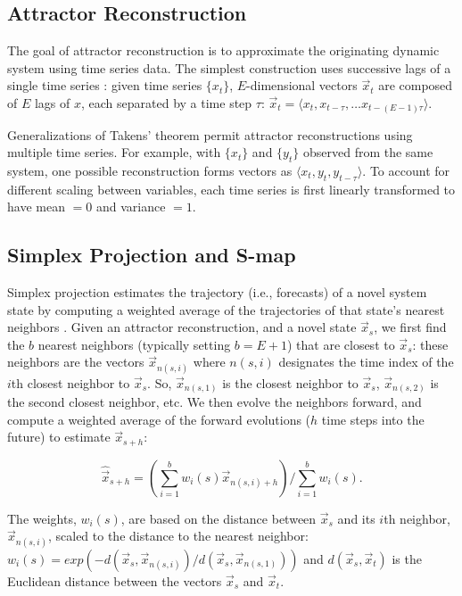 \subsection{Attractor Reconstruction}

The goal of attractor reconstruction is to approximate the originating dynamic system using time series data. The simplest construction uses successive lags of a single time series \cite{Takens_1981, Packard_1980}: given time series $\{x_t\}$, $E$-dimensional vectors $\vec{x}_t$ are composed of $E$ lags of $x$, each separated by a time step $\tau$: $\vec{x}_t = \langle x_t, x_{t-\tau}, \dots x_{t-(E-1)\tau}\rangle$.

Generalizations of Takens' theorem \cite{Deyle_2011, Sauer_1991} permit attractor reconstructions using multiple time series. For example, with $\{x_t\}$ and $\{y_t\}$ observed from the same system, one possible reconstruction forms vectors as $\langle x_t, y_t, y_{t-\tau}\rangle$. To account for different scaling between variables, each time series is first linearly transformed to have mean $= 0$ and variance $= 1$.

\subsection{Simplex Projection and S-map}

Simplex projection estimates the trajectory (i.e., forecasts) of a novel system state by computing a weighted average of the trajectories of that state's nearest neighbors \cite{Sugihara_1990}. Given an attractor reconstruction, and a novel state $\vec{x}_s$, we first find the $b$ nearest neighbors (typically setting $b = E + 1$) that are closest to $\vec{x}_s$: these neighbors are the vectors $\vec{x}_{n(s, i)}$ where $n(s, i)$ designates the time index of the $i$th closest neighbor to $\vec{x}_s$. So, $\vec{x}_{n(s, 1)}$ is the closest neighbor to $\vec{x}_s$, $\vec{x}_{n(s, 2)}$ is the second closest neighbor, etc. We then evolve the neighbors forward, and compute a weighted average of the forward evolutions ($h$ time steps into the future) to estimate $\vec{x}_{s+h}$:

\begin{equation}
\label{eqn_simplex}
\hat{\vec{x}}_{s+h}=\left(\sum_{i=1}^{b}{w_i\left(s\right)\vec{x}_{n(s, i)+h}}\right) \bigg/ \sum_{i=1}^{b}{w_i\left(s\right)}.
\end{equation}

The weights, $w_i(s)$, are based on the distance between $\vec{x}_s$ and its $i$th neighbor, $\vec{x}_{n(s, i)}$, scaled to the distance to the nearest neighbor: \\$w_i(s) = exp\left(-d(\vec{x}_s, \vec{x}_{n(s, i)})/d(\vec{x}_s, \vec{x}_{n(s, 1)})\right)$ and $d(\vec{x}_s, \vec{x}_t)$ is the Euclidean distance between the vectors $\vec{x}_s$ and $\vec{x}_t$.

